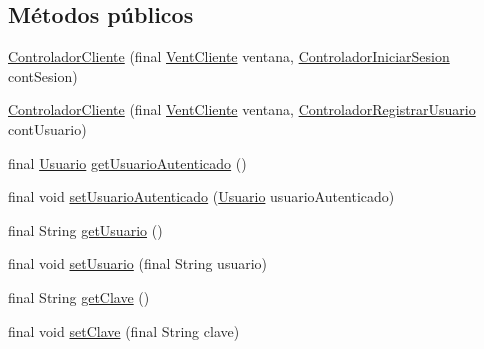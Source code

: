 \subsection*{Métodos públicos}
\begin{DoxyCompactItemize}
\item 
\hyperlink{classcom_1_1ucab_1_1javachat_1_1_cliente_1_1controller_1_1_controlador_cliente_a169ce22e78795bc739fde02d29afbf5a}{Controlador\-Cliente} (final \hyperlink{classcom_1_1ucab_1_1javachat_1_1_cliente_1_1view_1_1_vent_cliente}{Vent\-Cliente} ventana, \hyperlink{classcom_1_1ucab_1_1javachat_1_1_cliente_1_1controller_1_1_controlador_iniciar_sesion}{Controlador\-Iniciar\-Sesion} cont\-Sesion)
\item 
\hyperlink{classcom_1_1ucab_1_1javachat_1_1_cliente_1_1controller_1_1_controlador_cliente_ae11bb33a2245f1000c5df1834a360746}{Controlador\-Cliente} (final \hyperlink{classcom_1_1ucab_1_1javachat_1_1_cliente_1_1view_1_1_vent_cliente}{Vent\-Cliente} ventana, \hyperlink{classcom_1_1ucab_1_1javachat_1_1_cliente_1_1controller_1_1_controlador_registrar_usuario}{Controlador\-Registrar\-Usuario} cont\-Usuario)
\item 
final \hyperlink{classcom_1_1ucab_1_1javachat_1_1_cliente_1_1model_1_1_usuario}{Usuario} \hyperlink{classcom_1_1ucab_1_1javachat_1_1_cliente_1_1controller_1_1_controlador_cliente_a12ea6a6be82d2b5ce6bcc1fc6d4f3a73}{get\-Usuario\-Autenticado} ()
\item 
final void \hyperlink{classcom_1_1ucab_1_1javachat_1_1_cliente_1_1controller_1_1_controlador_cliente_a32c622eb684b582d03d81ae98bf8be49}{set\-Usuario\-Autenticado} (\hyperlink{classcom_1_1ucab_1_1javachat_1_1_cliente_1_1model_1_1_usuario}{Usuario} usuario\-Autenticado)
\item 
final String \hyperlink{classcom_1_1ucab_1_1javachat_1_1_cliente_1_1controller_1_1_controlador_cliente_ada03c074086d0d54321cdf0347147397}{get\-Usuario} ()
\item 
final void \hyperlink{classcom_1_1ucab_1_1javachat_1_1_cliente_1_1controller_1_1_controlador_cliente_a29e6cb2c38d42517282ce2da900b3516}{set\-Usuario} (final String usuario)
\item 
final String \hyperlink{classcom_1_1ucab_1_1javachat_1_1_cliente_1_1controller_1_1_controlador_cliente_a3e147fa15044b926e8f496e15153e8f9}{get\-Clave} ()
\item 
final void \hyperlink{classcom_1_1ucab_1_1javachat_1_1_cliente_1_1controller_1_1_controlador_cliente_a8647e56fdb735f7abdef284b023e9f53}{set\-Clave} (final String clave)

\end{DoxyCompactItemize}
